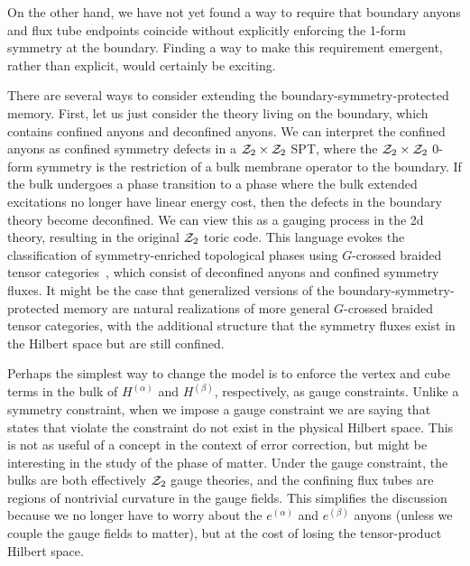 On the other hand, we have not yet found a way to require that boundary anyons and flux tube endpoints coincide without explicitly enforcing the 1-form symmetry at the boundary. Finding a way to make this requirement emergent, rather than explicit, would certainly be exciting. 

There are several ways to consider extending the boundary-symmetry-protected memory. First, let us just consider the theory living on the boundary, which contains confined anyons and deconfined anyons. We can interpret the confined anyons as confined symmetry defects in a $\mathcal{Z}_2\times\mathcal{Z}_2$ SPT, where the $\mathcal{Z}_2\times\mathcal{Z}_2$ 0-form symmetry is the restriction of a bulk membrane operator to the boundary. If the bulk undergoes a phase transition to a phase where the bulk extended excitations no longer have linear energy cost, then the defects in the boundary theory become deconfined. We can view this as a gauging process in the 2d theory, resulting in the original $\mathcal{Z}_2$ toric code. This language evokes the classification of symmetry-enriched topological phases using $G$-crossed braided tensor categories~\cite{Barkeshli2019Fractionalization}, which consist of deconfined anyons and confined symmetry fluxes. It might be the case that generalized versions of the boundary-symmetry-protected memory are natural realizations of more general $G$-crossed braided tensor categories, with the additional structure that the symmetry fluxes exist in the Hilbert space but are still confined.

Perhaps the simplest way to change the model is to enforce the vertex and cube terms in the bulk of $H^{(\alpha)}$ and $H^{(\beta)}$, respectively, as gauge constraints. Unlike a symmetry constraint, when we impose a gauge constraint we are saying that states that violate the constraint do not exist in the physical Hilbert space. This is not as useful of a concept in the context of error correction, but might be interesting in the study of the phase of matter. Under the gauge constraint, the bulks are both effectively $\mathcal{Z}_2$ gauge theories, and the confining flux tubes are regions of nontrivial curvature in the gauge fields. This simplifies the discussion because we no longer have to worry about the $e^{(\alpha)}$ and $e^{(\beta)}$ anyons (unless we couple the gauge fields to matter), but at the cost of losing the tensor-product Hilbert space. 

